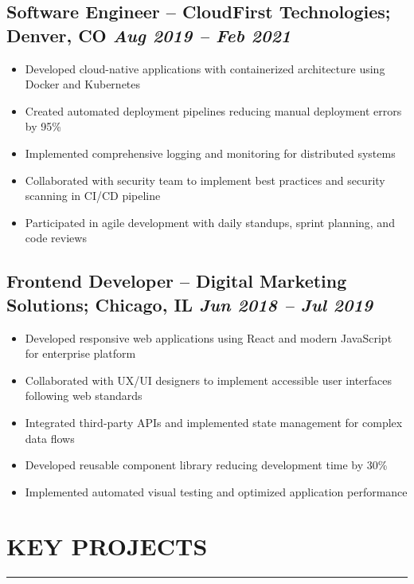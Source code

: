 \documentclass[a4paper,10pt]{article}
\begin{document}
    \subsection*{Software Engineer – CloudFirst Technologies; Denver, CO \hfill \textit{Aug 2019 – Feb 2021}}
    \vspace{-0.8em}
    \begin{itemize}[leftmargin=0.2cm, itemsep=0pt, label=--]
        \item Developed cloud-native applications with containerized architecture using Docker and Kubernetes
        \item Created automated deployment pipelines reducing manual deployment errors by 95\%
        \item Implemented comprehensive logging and monitoring for distributed systems
        \item Collaborated with security team to implement best practices and security scanning in CI/CD pipeline
        \item Participated in agile development with daily standups, sprint planning, and code reviews
    \end{itemize}

    \subsection*{Frontend Developer – Digital Marketing Solutions; Chicago, IL \hfill \textit{Jun 2018 – Jul 2019}}
    \vspace{-0.8em}
    \begin{itemize}[leftmargin=0.2cm, itemsep=0pt, label=--]
        \item Developed responsive web applications using React and modern JavaScript for enterprise platform
        \item Collaborated with UX/UI designers to implement accessible user interfaces following web standards
        \item Integrated third-party APIs and implemented state management for complex data flows
        \item Developed reusable component library reducing development time by 30\%
        \item Implemented automated visual testing and optimized application performance
    \end{itemize}

    \section*{KEY PROJECTS}
    \vspace{-0.8em}
    \hrule
    \vspace{0.2cm}
\end{document}
